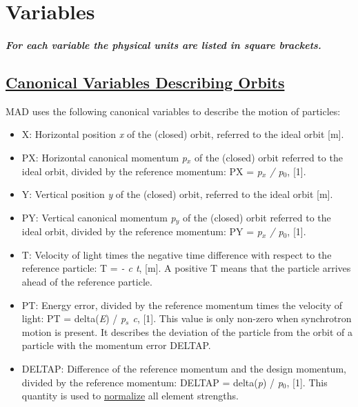 
\section{Variables}

\subparagraph{ For each variable the physical units are listed in square brackets. }

\subsection{\href{canon}{Canonical Variables Describing Orbits}} 
\label{subsec:tables_canon}
MAD uses the following canonical variables to describe the motion of particles: 
\begin{itemize}
   \item X: Horizontal position \textit{x} of the (closed) orbit,
     referred to the ideal orbit [m].    
   \item PX: Horizontal canonical momentum \textit{p$_x$} of the
     (closed) orbit referred to the ideal orbit, divided by the
     reference momentum: PX = \textit{p$_x$ / p$_0$}, [1].   
   \item Y: Vertical position \textit{y} of the (closed) orbit, referred
     to the ideal orbit [m].   
   \item PY: Vertical canonical momentum \textit{p$_y$} of the (closed)
     orbit referred to the ideal orbit, divided by the reference
     momentum: PY = \textit{p$_x$ / p$_0$}, [1].   
   \item T: Velocity of light times the negative time difference with
     respect to the reference particle: T = \textit{ - c t}, [m]. A
     positive T means that the particle arrives ahead of the reference
     particle.   
   \item PT: Energy error, divided by the reference momentum times the
     velocity of light: PT = delta(\textit{E}) / \textit{p$_s$ c},
     [1]. This value is only non-zero when synchrotron motion is
     present. It describes the deviation of the particle from the orbit
     of a particle with the momentum error DELTAP.   
   \item DELTAP: Difference of the reference momentum and the design
     momentum, divided by the reference momentum: DELTAP =
     delta(\textit{p}) / \textit{p$_0$}, [1]. This quantity is used to
     \href{defects.html}{normalize} all element strengths.   
\end{itemize} 


